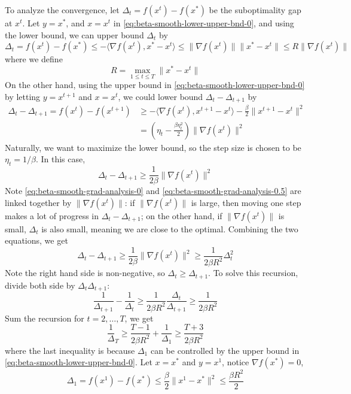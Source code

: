 \documentclass{scrartcl}
\begin{document}
To analyze the convergence, let $\Delta_t=f(x^t)-f(x^*)$ be the suboptimality gap at $x^t$. Let
$y=x^*$, and $x=x^t$ in \eqref{eq:beta-smooth-lower-upper-bnd-0}, and using the lower bound, we can
upper bound $\Delta_t$ by
\begin{equation}
  \Delta_t = f(x^t)-f(x^*) \leq -\langle \nabla f(x^t), x^*-x^t\rangle
  \leq \|\nabla f(x^t)\|\|x^*-x^t\| \leq R\|\nabla f(x^t)\|
  \label{eq:beta-smooth-grad-analysis-0}
\end{equation}
where we define
\begin{equation}
  R=\max_{1\leq t\leq T}\|x^*-x^t\|
\end{equation}
On the other hand, using the upper bound in \eqref{eq:beta-smooth-lower-upper-bnd-0} by letting
$y=x^{t+1}$ and $x=x^t$, we could lower bound $\Delta_t-\Delta_{t+1}$ by
\begin{equation*}
\begin{aligned}
  \Delta_t-\Delta_{t+1} = f(x^t)-f(x^{t+1})
  &\geq -\langle \nabla f(x^t), x^{t+1}-x^t\rangle - \frac{\beta}{2}\|x^{t+1}-x^t\|^2 \\
  &= \left(\eta_t - \frac{\beta\eta_t^2}{2}\right) \|\nabla f(x^t)\|^2
\end{aligned}
\end{equation*}
Naturally, we want to maximize the lower bound, so the step size is chosen to be
$\eta_t = 1/\beta$. In this case,
\begin{equation}
  \Delta_t - \Delta_{t+1} \geq \frac{1}{2\beta}\|\nabla f(x^t)\|^2
  \label{eq:beta-smooth-grad-analysis-0.5}
\end{equation}
Note \eqref{eq:beta-smooth-grad-analysis-0} and \eqref{eq:beta-smooth-grad-analysis-0.5} are linked
together by $\|\nabla f(x^t)\|$: if $\|\nabla f(x^t)\|$ is large, then moving one step makes a lot
of progress in $\Delta_t-\Delta_{t+1}$; on the other hand, if $\|\nabla f(x^t)\|$ is small,
$\Delta_t$ is also small, meaning we are close to the optimal.
Combining the two equations, we get
\begin{equation}
   \Delta_t - \Delta_{t+1}\geq \frac{1}{2\beta}\|\nabla f(x^t)\|^2
   \geq \frac{1}{2\beta R^2}\Delta_t^2
 \end{equation}
 Note the right hand side is non-negative, so $\Delta_t\geq \Delta_{t+1}$. To solve this recursion,
 divide both side by $\Delta_t\Delta_{t+1}$:
 \begin{equation}
   \frac{1}{\Delta_{t+1}} - \frac{1}{\Delta_t} \geq \frac{1}{2\beta R^2}\frac{\Delta_t}{\Delta_
   {t+1}} \geq \frac{1}{2\beta R^2}
 \end{equation}
 Sum the recursion for $t=2,\ldots,T$, we get
 \[
 \frac{1}{\Delta}_T \geq \frac{T-1}{2\beta R^2} + \frac{1}{\Delta_1}
 \geq \frac{T+3}{2\beta R^2}
 \]
 where the last inequality is because $\Delta_1$ can be controlled by the upper bound in
 \eqref {eq:beta-smooth-lower-upper-bnd-0}. Let $x=x^*$ and $y=x^1$, notice $\nabla f(x^*)=0$,
 \[
 \Delta_1 = f(x^1)-f(x^*) \leq \frac{\beta}{2}\|x^1-x^*\|^2 \leq \frac{\beta R^2}{2}
 \]
\end{document}
